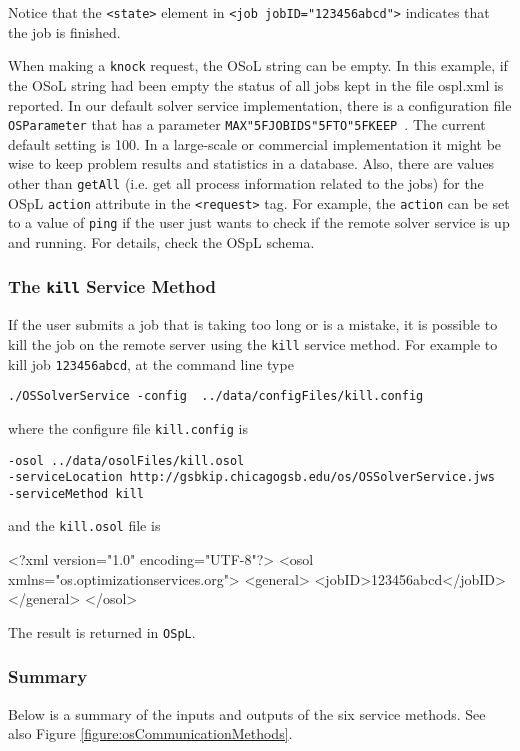 \documentclass[11pt]{article}
\newcounter{Fig}
\renewcommand{\_}{{\char"5F}}
\renewcommand{\{}{{\char"7B}}
\renewcommand{\}}{{\char"7D}}
\renewcommand{\^}{{\char"0D}}
\renewcommand{\'}{{\char"0D}}
\begin{document}
Notice that the {\tt <state>} element in {\tt <job jobID="123456abcd">} indicates that the job is finished.

When making a {\tt knock} request,  the OSoL string can be empty. In this example, if the OSoL string had been empty the status of all jobs kept in the file ospl.xml is reported.  In our default solver service implementation, there is a configuration file {\tt OSParameter} that has a parameter {\tt MAX\_JOBIDS\_TO\_KEEP }.  The current default setting is 100.  In a large-scale or commercial implementation it might be wise to keep problem results and statistics in a database.  Also, there are values other than {\tt getAll} (i.e. get all process information related to the jobs) for the OSpL {\tt action} attribute in the {\tt <request>} tag.  For example, the {\tt action} can be set to a value of {\tt ping} if the user just wants to check if the remote solver service is up and running. For details, check the OSpL schema.

\subsubsection{The  {\tt kill}   Service Method}

If the user submits a job that is taking too long or is a mistake, it is possible to kill the job on the remote server using the {\tt kill} service method. For example to kill job {\tt 123456abcd}, at the command line type
\begin{verbatim}
./OSSolverService -config  ../data/configFiles/kill.config
\end{verbatim}
where the configure file {\tt kill.config} is
\begin{verbatim}
-osol ../data/osolFiles/kill.osol
-serviceLocation http://gsbkip.chicagogsb.edu/os/OSSolverService.jws
-serviceMethod kill
\end{verbatim}
and the {\tt kill.osol} file is
\begin{verbatimtab}[4]
<?xml version="1.0" encoding="UTF-8"?>
<osol xmlns="os.optimizationservices.org">
 	<general>
 		<jobID>123456abcd</jobID>
	</general>
</osol>
\end{verbatimtab}

The result is returned in  {\tt OSpL}.
\subsubsection{Summary}

Below is a summary of the inputs and outputs of the six service methods. See also Figure \ref{figure:osCommunicationMethods}.
\end{document}

